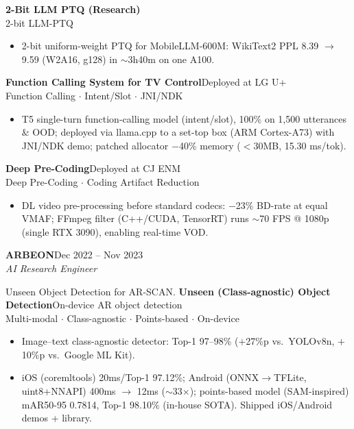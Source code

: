\documentclass[a4paper,10pt]{article}
\newcommand{\entry}[3]{\textbf{#1}\hfill{\color{muted}#2}\\ \textit{#3}\par\vspace{1pt}}
\newcommand{\proj}[3]{\vspace{2pt}\textbf{#1}\hfill{\color{muted}\small #2}\\{\color{accent}\small #3}\par}
\begin{document}
\proj{2-Bit LLM PTQ (Research)}{}{2-bit LLM-PTQ}
\begin{itemize}
  \item 2-bit uniform-weight PTQ for MobileLLM-600M: WikiText2 PPL 8.39 $\to$ 9.59 (W2A16, g128) in $\sim$3h40m on one A100.
\end{itemize}

\proj{Function Calling System for TV Control}{Deployed at LG U+}{Function Calling $\cdot$ Intent/Slot $\cdot$ JNI/NDK}
\begin{itemize}
  \item T5 single-turn function-calling model (intent/slot), 100\% on 1,500 utterances \& OOD; deployed via
  llama.cpp to a set-top box (ARM Cortex-A73) with JNI/NDK demo; patched allocator $-$40\% memory ($<$30MB, 15.30 ms/tok).
\end{itemize}

\proj{Deep Pre-Coding}{Deployed at CJ ENM}{Deep Pre-Coding $\cdot$ Coding Artifact Reduction}
\begin{itemize}
  \item DL video pre-processing before standard codecs: $-$23\% BD-rate at equal VMAF; FFmpeg filter (C++/CUDA, TensorRT)
  runs $\sim$70 FPS @ 1080p (single RTX 3090), enabling real-time VOD.
\end{itemize}

\vspace{3pt}
\entry{ARBEON}{Dec 2022 -- Nov 2023}{AI Research Engineer}
{\small Unseen Object Detection for AR-SCAN.}
\proj{Unseen (Class-agnostic) Object Detection}{On-device AR object detection}{Multi-modal $\cdot$ Class-agnostic $\cdot$ Points-based $\cdot$ On-device}
\begin{itemize}
  \item Image--text class-agnostic detector: Top-1 97--98\% ($+$27\%p vs.\ YOLOv8n, $+$10\%p vs.\ Google ML Kit).
  \item iOS (coremltools) 20ms/Top-1 97.12\%; Android (ONNX$\to$TFLite, uint8+NNAPI) 400ms $\to$ 12ms ($\sim$33$\times$);
  points-based model (SAM-inspired) mAR50-95 0.7814, Top-1 98.10\% (in-house SOTA). Shipped iOS/Android demos + library.
\end{itemize}

\end{document}
